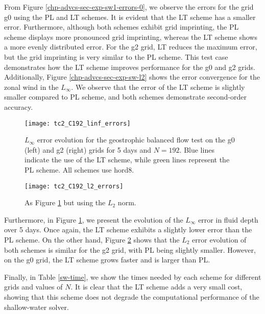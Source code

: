 \newpage
From Figure \ref{chp-advcs-sec-exp-sw1-errors-0}, we observe the errors for the grid g0 using the PL and LT schemes. It is evident that the LT scheme has a smaller error. Furthermore, although both schemes exhibit grid imprinting, the PL scheme displays more pronounced grid imprinting, whereas the LT scheme shows a more evenly distributed error.
For the g2 grid, LT reduces the maximum error, but the grid imprinting is very similar to the PL scheme.
This test case demonstrates how the LT scheme improves performance for the g0 and g2 grids.
Additionally, Figure \ref{chp-advcs-sec-exp-sw-l2} shows the error convergence for the zonal wind in the $L_{\infty}$. 
We observe that the error of the LT scheme is slightly smaller compared to PL scheme, and both schemes demonstrate second-order accuracy.
\begin{figure}[!htb]
	\centering
	\texttt{[image: tc2\_C192\_linf\_errors]}
	\caption{
		$L_{\infty}$ error evolution for the geostrophic balanced flow test  on the g0 (left) and g2 (right) grids for 5 days and $N=192$.
		Blue lines indicate the use of the LT scheme, while green lines represent the PL scheme. All schemes use hord8.
		\label{chp-advcs-sec-exp-sw-evol-linf}}
\end{figure}
\begin{figure}[!htb]
	\centering
	\texttt{[image: tc2\_C192\_l2\_errors]}
	\caption{ As Figure \ref{chp-advcs-sec-exp-sw-evol-linf} but using the 
		$L_{2}$ norm.
		\label{chp-advcs-sec-exp-sw-evol-l2}}
\end{figure}

Furthermore, in Figure \ref{chp-advcs-sec-exp-sw-evol-linf}, we present the evolution of the $L_{\infty}$ error in fluid depth over 5 days. 
Once again, the LT scheme exhibits a slightly lower error than the PL scheme.
On the other hand, Figure \ref{chp-advcs-sec-exp-sw-evol-l2} shows that the $L_2$ error evolution of both schemes is similar for the g2 grid, with PL being slightly smaller. However, on the g0 grid, the LT scheme grows faster and is larger than PL.
\newpage


Finally, in Table \ref{sw-time}, we show the times needed by each scheme for different grids and values of $N$. 
It is clear that the LT scheme adds a very small cost, showing that this scheme does not degrade the computational performance of the shallow-water solver.

